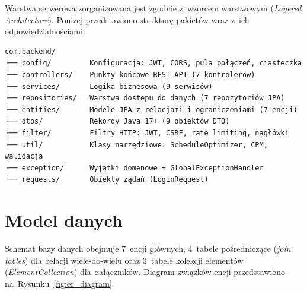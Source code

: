 Warstwa serwerowa zorganizowana jest zgodnie z~wzorcem warstwowym (\textit{Layered Architecture}). Poniżej przedstawiono strukturę pakietów wraz z~ich odpowiedzialnościami:

\begin{verbatim}
com.backend/
├── config/         Konfiguracja: JWT, CORS, pula połączeń, ciasteczka
├── controllers/    Punkty końcowe REST API (7 kontrolerów)
├── services/       Logika biznesowa (9 serwisów)
├── repositories/   Warstwa dostępu do danych (7 repozytoriów JPA)
├── entities/       Modele JPA z relacjami i ograniczeniami (7 encji)
├── dtos/           Rekordy Java 17+ (9 obiektów DTO)
├── filter/         Filtry HTTP: JWT, CSRF, rate limiting, nagłówki
├── util/           Klasy narzędziowe: ScheduleOptimizer, CPM, walidacja
├── exception/      Wyjątki domenowe + GlobalExceptionHandler
└── requests/       Obiekty żądań (LoginRequest)
\end{verbatim}

\section{Model danych}

Schemat bazy danych obejmuje 7~encji głównych, 4~tabele pośredniczące (\textit{join tables}) dla~relacji wiele-do-wielu oraz 3~tabele kolekcji elementów (\textit{ElementCollection}) dla~załączników. Diagram związków encji przedstawiono na~Rysunku~\ref{fig:er_diagram}.


